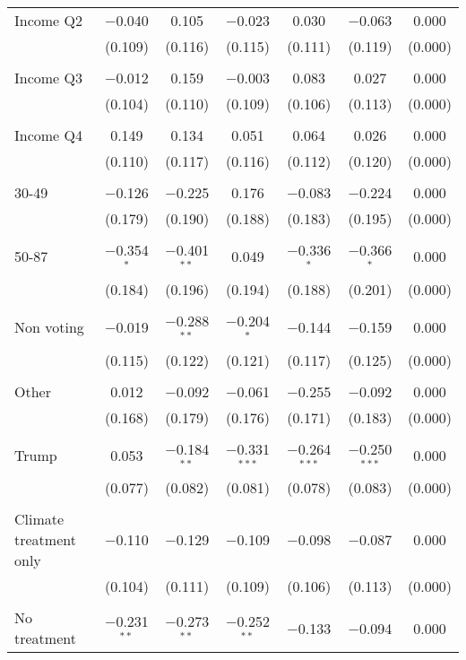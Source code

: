 \begin{tabular}{@{\extracolsep{5pt}}lcccccc}
 Income Q2 & $-$0.040 & 0.105 & $-$0.023 & 0.030 & $-$0.063 & 0.000 \\ 
  & (0.109) & (0.116) & (0.115) & (0.111) & (0.119) & (0.000) \\ 
  & & & & & & \\ 
 Income Q3 & $-$0.012 & 0.159 & $-$0.003 & 0.083 & 0.027 & 0.000 \\ 
  & (0.104) & (0.110) & (0.109) & (0.106) & (0.113) & (0.000) \\ 
  & & & & & & \\ 
 Income Q4 & 0.149 & 0.134 & 0.051 & 0.064 & 0.026 & 0.000 \\ 
  & (0.110) & (0.117) & (0.116) & (0.112) & (0.120) & (0.000) \\ 
  & & & & & & \\ 
 30-49 & $-$0.126 & $-$0.225 & 0.176 & $-$0.083 & $-$0.224 & 0.000 \\ 
  & (0.179) & (0.190) & (0.188) & (0.183) & (0.195) & (0.000) \\ 
  & & & & & & \\ 
 50-87 & $-$0.354$^{*}$ & $-$0.401$^{**}$ & 0.049 & $-$0.336$^{*}$ & $-$0.366$^{*}$ & 0.000 \\ 
  & (0.184) & (0.196) & (0.194) & (0.188) & (0.201) & (0.000) \\ 
  & & & & & & \\ 
 Non voting & $-$0.019 & $-$0.288$^{**}$ & $-$0.204$^{*}$ & $-$0.144 & $-$0.159 & 0.000 \\ 
  & (0.115) & (0.122) & (0.121) & (0.117) & (0.125) & (0.000) \\ 
  & & & & & & \\ 
 Other & 0.012 & $-$0.092 & $-$0.061 & $-$0.255 & $-$0.092 & 0.000 \\ 
  & (0.168) & (0.179) & (0.176) & (0.171) & (0.183) & (0.000) \\ 
  & & & & & & \\ 
 Trump & 0.053 & $-$0.184$^{**}$ & $-$0.331$^{***}$ & $-$0.264$^{***}$ & $-$0.250$^{***}$ & 0.000 \\ 
  & (0.077) & (0.082) & (0.081) & (0.078) & (0.083) & (0.000) \\ 
  & & & & & & \\ 
 Climate treatment only & $-$0.110 & $-$0.129 & $-$0.109 & $-$0.098 & $-$0.087 & 0.000 \\ 
  & (0.104) & (0.111) & (0.109) & (0.106) & (0.113) & (0.000) \\ 
  & & & & & & \\ 
 No treatment & $-$0.231$^{**}$ & $-$0.273$^{**}$ & $-$0.252$^{**}$ & $-$0.133 & $-$0.094 & 0.000 \\ 

\end{tabular}
